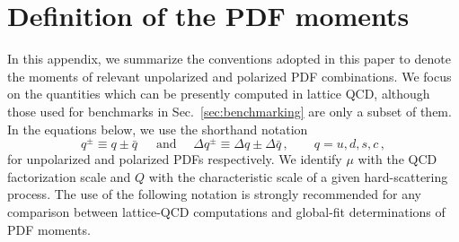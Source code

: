 \section{Definition of the PDF moments}
\label{app:notation}

In this appendix, we summarize the conventions adopted in this paper to denote 
the moments of relevant unpolarized and polarized PDF combinations.
%
We focus on the quantities which can be presently computed in lattice QCD,
although those used for benchmarks in Sec.~\ref{sec:benchmarking} are only
a subset of them.
%
In the equations below, we use the shorthand notation
\begin{equation}
q^\pm \equiv q\pm\bar{q}\, 
\quad\text{ and }\quad
\Delta q^\pm \equiv \Delta q\pm\Delta\bar{q}\, 
,\qquad q=u,d,s,c \,,
\end{equation}
%
for unpolarized and polarized PDFs respectively.
%
We identify $\mu$ with the QCD factorization scale and $Q$ with the 
characteristic scale of a given hard-scattering process.
%
The use of the following notation is strongly recommended for any comparison 
between lattice-QCD computations and global-fit determinations of 
PDF moments.

